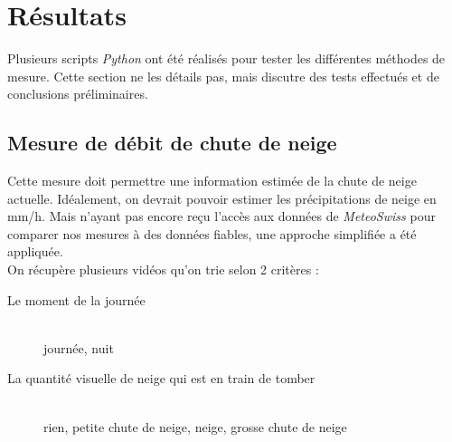 \section{Résultats}
Plusieurs scripts \emph{Python} ont été réalisés pour tester les différentes
méthodes de mesure. Cette section ne les détails pas, mais discutre des tests effectués
et de conclusions préliminaires.

\subsection{Mesure de débit de chute de neige} \label{snowfall}
Cette mesure doit permettre une information estimée de la chute de neige
actuelle. Idéalement, on devrait pouvoir estimer les précipitations de neige
en mm/h. Mais n'ayant pas encore reçu l'accès aux données de \emph{MeteoSwiss}
pour comparer nos mesures à des données fiables, une approche simplifiée a été
appliquée.\\
On récupère plusieurs vidéos qu'on trie selon 2 critères :
\begin{description}
    \item[Le moment de la journée] \hfill \\
    journée, nuit
    \item[La quantité visuelle de neige qui est en train de tomber] \hfill \\
    rien, petite chute de neige, neige, grosse chute de neige
\end{description}

